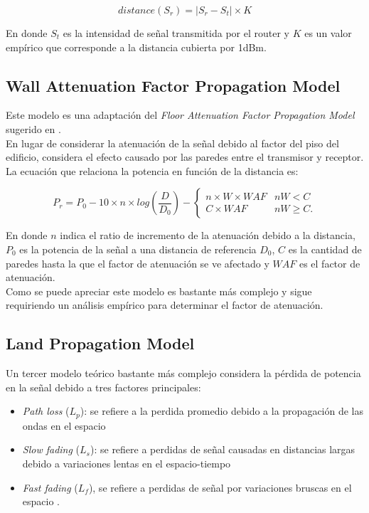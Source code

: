 \documentclass[journal]{IEEEtran}
\begin{document}
$$distance(S_r) = |S_r - S_t| \times K$$

En donde $S_t$ es la intensidad de señal transmitida por el router y $K$ es un valor empírico que corresponde a la distancia cubierta por 1dBm.\\

\subsection{Wall Attenuation Factor Propagation Model}

Este modelo es una adaptación del \emph{Floor Attenuation Factor Propagation Model} sugerido en \cite{path:loss:prediction:models}.\\

En lugar de considerar la atenuación de la señal debido al factor del piso del edificio, considera el efecto causado por las paredes entre el transmisor y receptor.\\

La ecuación que relaciona la potencia en función de la distancia es:

\begin{equation*}
P_r = P_0 - 10 \times n \times log(\frac {D} {D_0}) - \begin{cases}
n \times W \times WAF &nW < C\\
C \times WAF &nW \geq C.
\end{cases}
\end{equation*}

En donde $n$ indica el ratio de incremento de la atenuación debido a la distancia, $P_0$ es la potencia de la señal a una distancia de referencia $D_0$, $C$ es la cantidad de paredes hasta la que el factor de atenuación se ve afectado y $WAF$ es el factor de atenuación.\\

Como se puede apreciar este modelo es bastante más complejo y sigue requiriendo un análisis empírico para determinar el factor de atenuación.

\subsection{Land Propagation Model}

Un tercer modelo teórico bastante más complejo considera la pérdida de potencia en la señal debido a tres factores principales:

\begin{itemize}

\item \emph{Path loss} ($L_p$): se refiere a la perdida promedio debido a la propagación de las ondas en el espacio

\item \emph{Slow fading} ($L_s$): se refiere a perdidas de señal causadas en distancias largas debido a variaciones lentas en el espacio-tiempo \cite{introduction:wireless:mobile:systems}

\item \emph{Fast fading} ($L_f$), se refiere a perdidas de señal por variaciones bruscas en el espacio \cite{survey:propagation:models} \cite{wireless:communications}.

\end{itemize}
\end{document}
